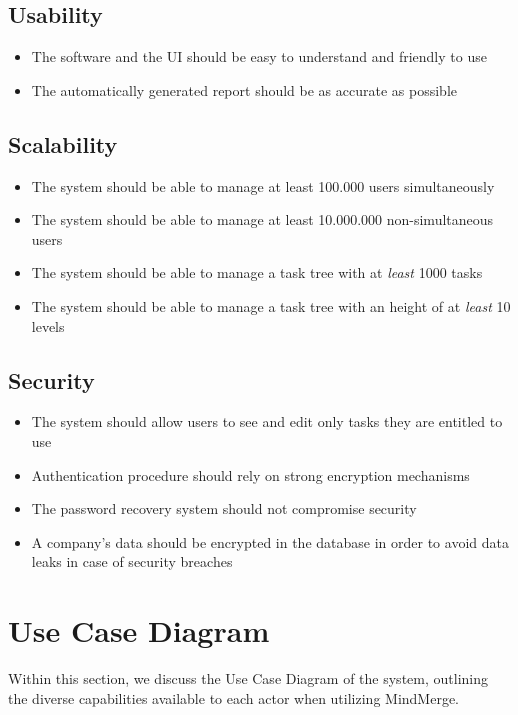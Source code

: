 \documentclass{article}
\begin{document}
\subsection{Usability}
\begin{itemize}
    \item The software and the UI should be easy to understand and friendly to use
    \item The automatically generated report should be as accurate as possible
\end{itemize}

\subsection{Scalability}
\begin{itemize}
    \item The system should be able to manage at least 100.000 users simultaneously
    \item The system should be able to manage at least 10.000.000 non-simultaneous users
    \item The system should be able to manage a task tree with at \textit{least} 1000 tasks
    \item The system should be able to manage a task tree with an height of at \textit{least} 10 levels
\end{itemize}

\subsection{Security}
\begin{itemize}
    \item The system should allow users to see and edit only tasks they are entitled to use
    \item Authentication procedure should rely on strong encryption mechanisms
    \item The password recovery system should not compromise security
    \item A company's data should be encrypted in the database in order to avoid data leaks in case of security breaches
\end{itemize}
\pagebreak

\section{Use Case Diagram}
Within this section, we discuss the Use Case Diagram of the system, outlining the diverse capabilities available to each actor when utilizing MindMerge.
\end{document}
